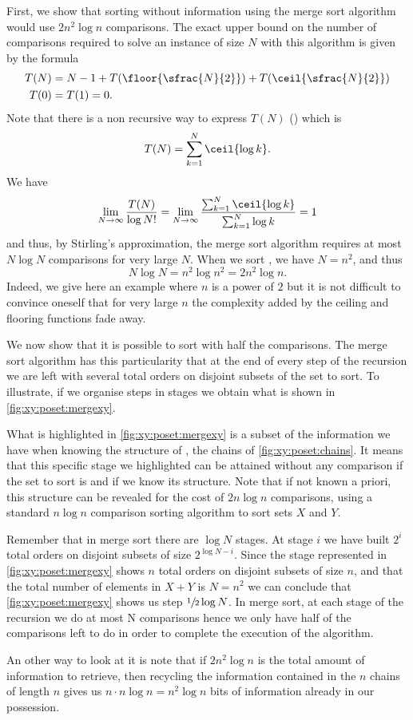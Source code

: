 First, we show that sorting \XY without information using the merge sort algorithm would use $2
n^2 \log n$ comparisons. The exact upper bound on the number
of comparisons required to solve an instance of size \(N\) with this algorithm
is given by the formula
\begin{align*}
T(N) &= N - 1 + T(\floor{\sfrac{N}{2}}) + T(\ceil{\sfrac{N}{2}})\\
T(0) &= T(1) = 0.
\end{align*}
Note that there is a non recursive way to express \(T(N)\) (\citet*{OEIS:A001855}) which is
\begin{displaymath}
T(N) = \sum_{k=1}^{N} \ceil{\log k}.
\end{displaymath}
We have
\begin{displaymath}
\lim_{N\to\infty}\frac{T(N)}{\log N!} =
\lim_{N\to\infty}\frac{\sum_{k=1}^{N}\ceil{\log k}}{ \sum_{k=1}^{N} \log k} = 1
\end{displaymath}
and thus, by Stirling's approximation, the merge sort algorithm requires at
most \(N \log N\) comparisons for very large \(N\). When we sort \XY, we have \(N =
n^2\), and thus
\[N \log N = n^2 \log n^2 = 2 n^2 \log n.\]
Indeed, we give here an example where \(n\) is a power of \(2\) but it is not
difficult to convince oneself that for very large \(n\) the complexity added
by the ceiling and flooring functions fade away.

We now show that it is possible to sort \XY with half the comparisons. The
merge sort algorithm has this particularity that at the end of every step of
the recursion we are left with several total orders on disjoint subsets of the
set to sort. To illustrate, if we organise steps in stages we obtain what is
shown in \ref{fig:xy:poset:mergexy}.

What is highlighted in \ref{fig:xy:poset:mergexy} is a subset of the
information we have when knowing the structure of \XY, \ie the chains of
\ref{fig:xy:poset:chains}. It means that this specific stage we
highlighted can be attained without any comparison if the set to sort is \XY
and if we know its structure. Note that if not known a priori, this structure
can be revealed for the cost of \(2n \log n\) comparisons, using a standard \(n
\log n\) comparison sorting algorithm to sort sets \(X\) and \(Y\).

Remember that in merge sort there are $\log N$ stages. At stage $i$ we have
built $2^{i}$ total orders on disjoint subsets of size $2^{\log N - i}$. Since
the stage represented in \ref{fig:xy:poset:mergexy} shows $n$ total orders on
disjoint subsets of size $n$, and that the total number of elements in $X+Y$ is
$N = n^2$ we can conclude that \ref{fig:xy:poset:mergexy} shows us step
$\sfrac{1}{2} \log N$. In merge sort, at each stage of the recursion we do at
most N comparisons hence we only have half of the comparisons left to do in
order to complete the execution of the algorithm.

An other way to look at it is note that if \(2n^2 \log n\) is the total amount
of information to retrieve, then recycling the information contained in the
\(n\) chains of length \(n\) gives us \(n \cdot n \log n = n^2 \log n\) bits of
information already in our possession.

